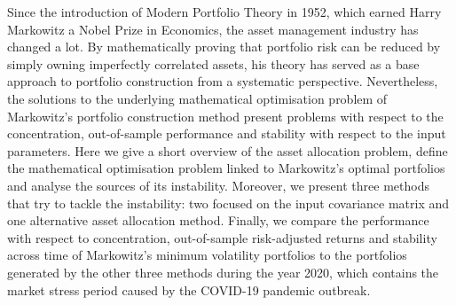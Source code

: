 Since the introduction of Modern Portfolio Theory in 1952, which earned Harry Markowitz a Nobel Prize in Economics, the asset management industry has changed a lot. By mathematically proving that portfolio risk can be reduced by simply owning imperfectly correlated assets, his theory has served as a base approach to portfolio construction from a systematic perspective. Nevertheless, the solutions to the underlying mathematical optimisation problem of Markowitz's portfolio construction method present problems with respect to the concentration, out-of-sample performance and stability with respect to the input parameters. Here we give a short overview of the asset allocation problem, define the mathematical optimisation problem linked to Markowitz's optimal portfolios and analyse the sources of its instability. Moreover, we present three methods that try to tackle the instability: two focused on the input covariance matrix and one alternative asset allocation method. Finally, we compare the performance with respect to concentration, out-of-sample risk-adjusted returns and stability across time of Markowitz's minimum volatility portfolios to the portfolios generated by the other three methods during the year 2020, which contains the market stress period caused by the COVID-19 pandemic outbreak.